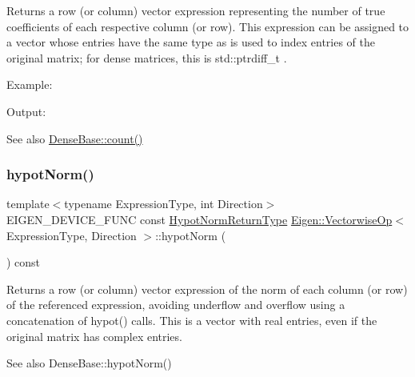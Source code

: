 \begin{DoxyReturn}{Returns}
a row (or column) vector expression representing the number of {\ttfamily true} coefficients of each respective column (or row). This expression can be assigned to a vector whose entries have the same type as is used to index entries of the original matrix; for dense matrices, this is {\ttfamily std\+::ptrdiff\+\_\+t} .
\end{DoxyReturn}
Example\+: 
\begin{DoxyCodeInclude}{0}
\end{DoxyCodeInclude}
 Output\+: 
\begin{DoxyVerbInclude}
\end{DoxyVerbInclude}


\begin{DoxySeeAlso}{See also}
\mbox{\hyperlink{class_eigen_1_1_dense_base_a229be090c665b9bf7d1fcdfd1ab6e0c1}{Dense\+Base\+::count()}} 
\end{DoxySeeAlso}
\mbox{\label{class_eigen_1_1_vectorwise_op_a9ae3feb2723628a3bcff6eabda2fa77d}} 
\subsubsection{\texorpdfstring{hypotNorm()}{hypotNorm()}}
{\footnotesize\ttfamily template$<$typename Expression\+Type, int Direction$>$ \\
E\+I\+G\+E\+N\+\_\+\+D\+E\+V\+I\+C\+E\+\_\+\+F\+U\+NC const \mbox{\hyperlink{class_eigen_1_1_partial_redux_expr}{Hypot\+Norm\+Return\+Type}} \mbox{\hyperlink{class_eigen_1_1_vectorwise_op}{Eigen\+::\+Vectorwise\+Op}}$<$ Expression\+Type, Direction $>$\+::hypot\+Norm (\begin{DoxyParamCaption}{ }\end{DoxyParamCaption}) const\hspace{0.3cm}{\ttfamily [inline]}}

\begin{DoxyReturn}{Returns}
a row (or column) vector expression of the norm of each column (or row) of the referenced expression, avoiding underflow and overflow using a concatenation of hypot() calls. This is a vector with real entries, even if the original matrix has complex entries.
\end{DoxyReturn}
\begin{DoxySeeAlso}{See also}
Dense\+Base\+::hypot\+Norm() 
\end{DoxySeeAlso}
\mbox{\label{class_eigen_1_1_vectorwise_op_a87b514857655134e74ee313d865ab6d6}} 
